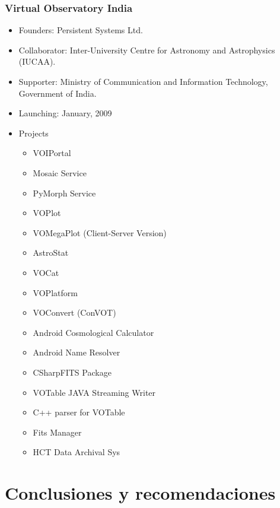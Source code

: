 \documentclass[11pt]{article}
\begin{document}
          \subsubsection{Virtual Observatory India}
              \begin{itemize}
                  \item Founders: Persistent Systems Ltd.
                  \item Collaborator: Inter-University Centre for Astronomy and
Astrophysics (IUCAA).
                  \item Supporter: Ministry of Communication and Information
Technology, Government of India.
                  \item Launching: January, 2009
                  \item Projects
                      \begin{itemize}
                          \item VOIPortal
                          \item Mosaic Service
                          \item PyMorph Service
                          \item VOPlot
                          \item VOMegaPlot (Client-Server Version)
                          \item AstroStat
                          \item VOCat
                          \item VOPlatform
                          \item VOConvert (ConVOT)
                          \item Android Cosmological Calculator
                          \item Android Name Resolver
                          \item CSharpFITS Package
                          \item VOTable JAVA Streaming Writer
                          \item C++ parser for VOTable
                          \item Fits Manager
                          \item HCT Data Archival Sys
                      \end{itemize}   
              \end{itemize}

      \section{Conclusiones y recomendaciones}
\end{document}
